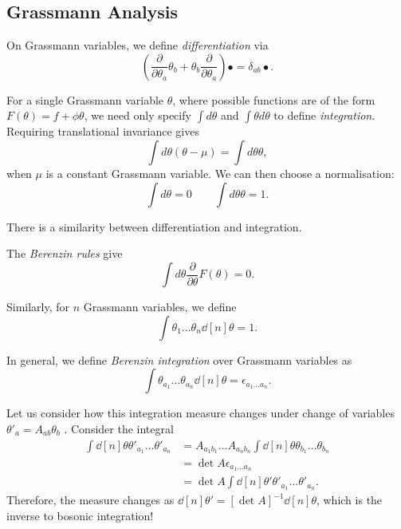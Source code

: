 \subsection{Grassmann Analysis}%
\label{sub:grassmann_analysis}

\begin{definition}[differentiation]
  On Grassmann variables, we define \emph{differentiation} via
  \begin{equation}
    \left( \frac{\partial }{\partial \theta_a} \theta_b + \theta_b \frac{\partial }{\partial \theta_a} \right) \bullet = \delta_{ab} \bullet.
  \end{equation}
\end{definition}

For a single Grassmann variable $\theta$, where possible functions are of the form $F(\theta) = f + \phi \theta$, we need only specify $\int d\theta$ and $\int \theta d\theta$ to define \emph{integration}.
Requiring translational invariance gives
\begin{equation}
  \int d\theta (\theta - \mu) = \int d\theta \theta,
\end{equation}
when $\mu$ is a constant Grassmann variable.
We can then choose a normalisation:
\begin{equation}
  \int d\theta = 0 \qquad \int d\theta \theta = 1.
\end{equation}
\begin{remark}
  There is a similarity between differentiation and integration.
\end{remark}

The \emph{Berenzin rules} give
\begin{equation}
  \int d\theta \frac{\partial }{\partial \theta} F(\theta) = 0.
\end{equation}

Similarly, for $n$  Grassmann variables, we define
\begin{equation}
  \int \theta_1 \dots \theta_n \dd[n]{\theta} = 1.
\end{equation}

\begin{definition}
  In general, we define \emph{Berenzin integration} over Grassmann variables as
  \begin{equation}
    \int \theta_{a_1} \dots \theta_{a_n} \dd[n]{\theta} = \epsilon_{a_1 \dots a_n}.
  \end{equation}
\end{definition}

Let us consider how this integration measure changes under change of variables $\theta'_a = A_{ab} \theta_b$ . Consider the integral
\begin{align}
  \int \dd[n]{\theta} \theta'_{a_1} \dots \theta'_{a_n} &= A_{a_1 b_1} \dots A_{a_n b_n} \int \dd[n]{\theta} \theta_{b_1} \dots \theta_{b_n} \\
  &= \det{A} \epsilon_{a_1 \dots a_n} \\
  &= \det{A} \int \dd[n]{\theta'} \theta'_{a_1} \dots\theta'_{a_n}.
\end{align} 
Therefore, the measure changes as $\dd[n]{\theta'} = [\det{A}]^{-1} \dd[n]{\theta}$, which is the inverse to bosonic integration!

